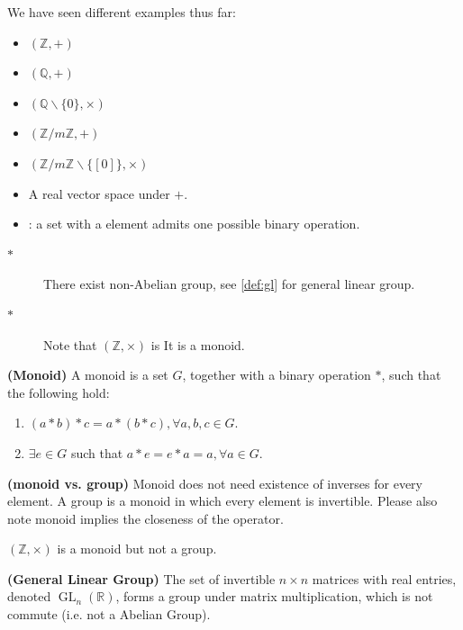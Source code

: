 \documentclass{article}
\newcommand{\bfs}[1]{\textbf{({#1}) }}
\newcommand{\GL}{\operatorname{GL}}
\begin{document}
\begin{exma}
 We have seen different  examples thus far: 
 \begin{itemize}
     \item $(\mathbb{Z},+)$
     \item $(\mathbb{Q},+)$
     \item $(\mathbb{Q} \backslash\{0\}, \times)$
     \item $(\mathbb{Z} / m \mathbb{Z},+)$
     \item $(\mathbb{Z} / m \mathbb{Z} \backslash\{[0]\}, \times)$
     \item A real vector space under $+$.
     \item {}: a set with a  element admits one possible binary operation.
 \end{itemize} 
 
 \begin{description}
 \item[$\ast$] There exist non-Abelian group, see \cref{def:gl} for general linear group.
 \item[$\ast$] Note that $(\mathbb{Z}, \times)$ is  It is a monoid.
 \end{description}
\end{exma}
\begin{defa}{\bfs{Monoid}}
 A monoid is a set $G$, together with a binary operation $*$, such that the following hold:
 \begin{enumerate}
     \item {} $(a * b) * c=a *(b * c), \forall a, b, c \in G$.
     \item {} $\exists e \in G$ such that $a * e=e * a=a, \forall a \in G$.
 \end{enumerate}
\end{defa}
\begin{rema}{\bfs{monoid vs. group}}
Monoid does not need existence of inverses for every element. A group is a monoid in which every element is invertible. Please also note monoid implies the closeness of the operator.
\end{rema}
\begin{exma}
 $(\mathbb{Z}, \times)$ is a monoid but not a group.
\end{exma}
\begin{defa}{\bfs{General Linear Group}}\label{def:gl}
 The set of invertible $n \times n$ matrices with real entries, denoted $\GL_{n}(\mathbb{R})$, forms a group under matrix multiplication, which is not commute (i.e. not a Abelian Group).
\end{defa}
\end{document}

